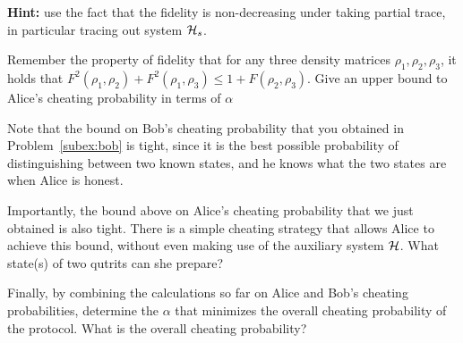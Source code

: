 \documentclass[a4paper,10pt,landscape,twocolumn]{scrartcl}
\begin{document}
\begin{exercise}
\begin{subex}
\textbf{Hint: } use the fact that the fidelity is non-decreasing under taking partial trace, in particular tracing out system $\mathcal{H}_s$.

\end{subex}

\begin{subex}
Remember the property of fidelity that for any three density matrices $\rho_1, \rho_2, \rho_3$, it holds that $F^2(\rho_1, \rho_2) + F^2(\rho_1, \rho_3) \leq 1 + F(\rho_2, \rho_3)$. Give an upper bound to Alice's cheating probability in terms of $\alpha$
\end{subex}

\begin{subex}
Note that the bound on Bob's cheating probability that you obtained in Problem~\ref{subex:bob} is tight, since it is the best possible probability of distinguishing between two known states, and he knows what the two states are when Alice is honest. 

Importantly, the bound above on Alice's cheating probability that we just obtained is also tight. There is a simple cheating strategy that allows Alice to achieve this bound, without even making use of the auxiliary system $\mathcal{H}$. What state(s) of two qutrits can she prepare?
\end{subex}

\begin{subex}
Finally, by combining the calculations so far on Alice and Bob's cheating probabilities, determine the $\alpha$ that minimizes the overall cheating probability of the protocol. What is the overall cheating probability?
\end{subex}

\end{exercise}
\end{document}
